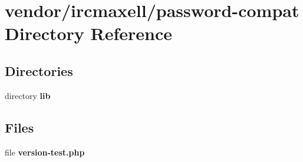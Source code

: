 \section{vendor/ircmaxell/password-\/compat Directory Reference}
\label{dir_9d68f8ea348281019baffe2ccca5d6f6}
\subsection*{Directories}
\begin{DoxyCompactItemize}
\item 
directory {\bf lib}
\end{DoxyCompactItemize}
\subsection*{Files}
\begin{DoxyCompactItemize}
\item 
file {\bf version-\/test.\+php}
\end{DoxyCompactItemize}
